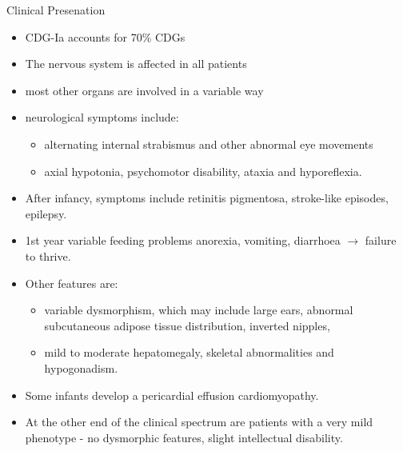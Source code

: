 \documentclass[presentation, smaller]{beamer}
\begin{document}
\begin{frame}[label={sec:org2f712cb}]{Clinical Presenation}
\begin{itemize}
\item CDG-Ia accounts for 70\% CDGs
\item The nervous system is affected in all patients
\item most other organs are involved in a variable way
\item neurological symptoms include:
\begin{itemize}
\item alternating internal strabismus and other abnormal eye movements
\item axial hypotonia, psychomotor disability, ataxia and hyporeflexia.
\end{itemize}
\item After infancy, symptoms include retinitis pigmentosa, stroke-like episodes, \textpm{} epilepsy.
\item 1st year variable feeding problems anorexia, vomiting, diarrhoea \(\to\) failure to thrive.
\item Other features are:
\begin{itemize}
\item variable dysmorphism, which may include large ears, abnormal
subcutaneous adipose tissue distribution, inverted nipples,
\item mild to moderate hepatomegaly, skeletal abnormalities and hypogonadism.
\end{itemize}
\item Some infants develop a pericardial effusion \textpm{} cardiomyopathy.
\item At the other end of the clinical spectrum are patients with a very
mild phenotype - no dysmorphic features, slight intellectual disability.
\end{itemize}
\end{frame}
\end{document}
